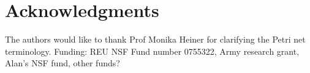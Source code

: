 \documentclass[11pt]{amsart}
\begin{document}
\section*{Acknowledgments}
The authors would like to thank Prof Monika Heiner for clarifying the Petri
net terminology.
Funding: REU NSF Fund number 0755322, Army research grant, Alan's
NSF fund, other funds?

%

\end{document}
